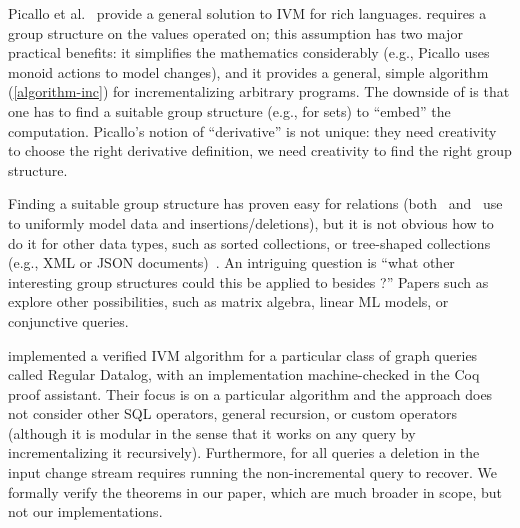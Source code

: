 Picallo et al.~\cite{picallo-scop19} provide a general solution to IVM for
rich languages.  \dbsp requires a group structure on the values operated on;
this assumption has two major practical benefits: it simplifies the mathematics considerably
(e.g., Picallo uses monoid actions to model changes), and it provides a general, simple
algorithm (\ref{algorithm-inc}) for incrementalizing arbitrary programs.  The downside of
\dbsp is that one has to find a suitable group structure (e.g., \zrs for sets) to ``embed''
the computation.  Picallo's notion of ``derivative'' is not unique: they need creativity to choose
the right derivative definition, we need creativity to find the right group structure.

Finding a suitable group structure has proven easy for relations (both~\cite{koch-pods10}
and~\cite{green-tcs11} use \zrs to uniformly model data and insertions/deletions), but it is
not obvious how to do it for other data types, such as sorted collections, or tree-shaped
collections (e.g., XML or JSON documents)~\cite{foster-planx08}.  An intriguing question
is ``what other interesting group structures could this be applied to besides \zrs?''
Papers such as~\cite{nikolic-icmd18} explore other possibilities, such as matrix algebra,
linear ML models, or conjunctive queries.



\cite{bonifati-iclp2018} implemented a verified IVM algorithm for a particular
class of graph queries called Regular Datalog, with an implementation machine-checked in the
Coq proof assistant. Their focus is on a particular algorithm and the approach does not
consider other SQL operators, general recursion, or custom operators (although it is modular
in the sense that it works on any query by incrementalizing it recursively). Furthermore,
for all queries a deletion in the input change stream requires running the non-incremental
query to recover.  We formally verify the theorems in our paper, which
are much broader in scope, but not our implementations.

